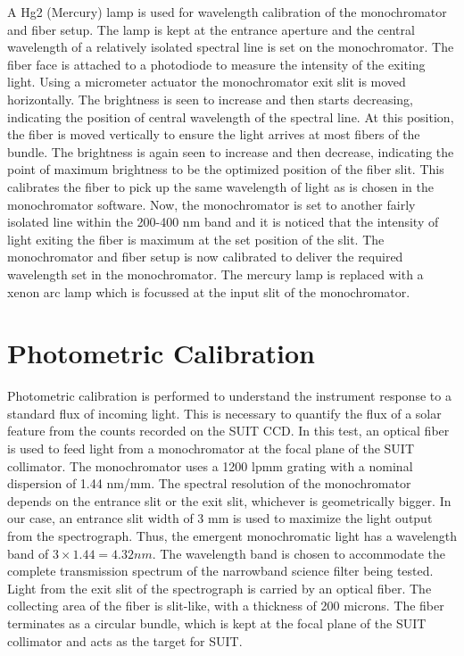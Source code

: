\documentclass[12pt]{spieman}  %
\begin{document}
A Hg2 (Mercury) lamp is used for wavelength calibration of the monochromator and fiber setup. The lamp is kept at the entrance aperture and the central wavelength of a relatively isolated spectral line is set on the monochromator. The fiber face is attached to a photodiode to measure the intensity of the exiting light. Using a micrometer actuator the monochromator exit slit is moved horizontally. The brightness is seen to increase and then starts decreasing, indicating the position of central wavelength of the spectral line. At this position, the fiber is moved vertically to ensure the light arrives at most fibers of the bundle. The brightness is again seen to increase and then decrease, indicating the point of maximum brightness to be the optimized position of the fiber slit. This calibrates the fiber to pick up the same wavelength of light as is chosen in the monochromator software. Now, the monochromator is set to another fairly isolated line within the 200-400 nm band and it is noticed that the intensity of light exiting the fiber is maximum at the set position of the slit. The monochromator and fiber setup is now calibrated to deliver the required wavelength set in the monochromator. The mercury lamp is replaced with a xenon arc lamp which is focussed at the input slit of the monochromator.
 
\section{Photometric Calibration}
Photometric calibration is performed to understand the instrument response to a standard flux of incoming light. This is necessary to quantify the flux of a solar feature from the counts recorded on the SUIT CCD. In this test, an optical fiber is used to feed light from a monochromator at the focal plane of the SUIT collimator. The monochromator uses a 1200 lpmm grating with a nominal dispersion of 1.44 nm/mm. The spectral resolution of the monochromator depends on the entrance slit or the exit slit, whichever is geometrically bigger. In our case, an entrance slit width of 3 mm is used to maximize the light output from the spectrograph. Thus, the emergent monochromatic light has a wavelength band of $3\times 1.44 = 4.32 nm$. The wavelength band is chosen to accommodate the complete transmission spectrum of the narrowband science filter being tested. Light from the exit slit of the spectrograph is carried by an optical fiber. The collecting area of the fiber is slit-like, with a thickness of 200 microns. The fiber terminates as a circular bundle, which is kept at the focal plane of the SUIT collimator and acts as the target for SUIT.
	
\end{document}
